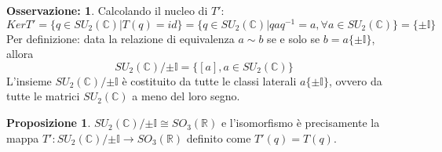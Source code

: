 \documentclass[12pt,a4paper]{report}
\theoremstyle{definition}
\theoremstyle{Theorem}
\newtheorem{Prop}[Def]{Proposizione}
\theoremstyle{definition}
\theoremstyle{definition}
\theoremstyle{definition}
\newtheorem{Obs}[Def]{Osservazione:}
\begin{document}
\begin{Obs} \label{Obs:3.2.3.1}
	Calcolando il nucleo di $T'$:$$KerT'=\{q\in SU_2(\mathbb{C})| T(q)=id\}=\{q\in SU_2(\mathbb{C})|qaq^{-1}=a, \forall a\in SU_2(\mathbb{C})\}=\{\pm\mathbb{I}\}$$
	Per definizione: data la relazione di equivalenza $a\sim b$ se e solo se $b=a\{\pm \mathbb{I}\}$, allora
	$$SU_2(\mathbb{C})/{\pm \mathbb{I}}=\{[a], a\in SU_2(\mathbb{C})\}$$
	L'insieme $SU_2(\mathbb{C})/{\pm \mathbb{I}}$ è costituito da tutte le classi laterali $a\{\pm\mathbb{I}\}$, ovvero da tutte le matrici $SU_2(\mathbb{C})$ a meno del loro segno.
\end{Obs}
\begin{Prop} \label{prop:3.5.1}
	$SU_2(\mathbb{C})/{\pm \mathbb{I}}\cong SO_3(\mathbb{R})$ e l'isomorfismo è precisamente la mappa $T':SU_2(\mathbb{C})/{\pm \mathbb{I}}\longrightarrow SO_3(\mathbb{R})$ definito come $T'(q)=T(q)$.
\end{Prop}
\end{document}
